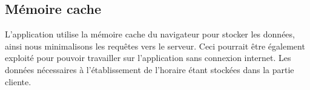 \subsection{Mémoire cache}
L'application utilise la mémoire cache du navigateur pour stocker les données, ainsi nous minimalisons les requêtes vers le serveur. Ceci pourrait être également exploité pour pouvoir travailler sur l'application sans connexion internet. Les données nécessaires à l'établissement de l'horaire étant stockées dans la partie cliente.
